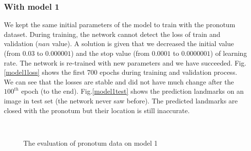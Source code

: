 \documentclass[12pt,a4paper]{article}
\begin{document}
\subsubsection{With model 1}
We kept the same initial parameters of the model to train with the pronotum dataset. During training, the network cannot detect the loss of train and validation ($nan$ value). A solution is given that we decreased the initial value (from $0.03$ to $0.000001$) and the stop value (from $0.0001$ to $0.0000001$) of learning rate. The network is re-trained with new parameters and we have succeeded. Fig.\ref{model1loss} shows the first 700 epochs during training and validation process. We can see that the losses are stable and did not have much change after the $100^{th}$ epoch (to the end). Fig.\ref{model1test} shows the prediction landmarks on an image in test set (the network never saw before). The predicted landmarks are closed with the pronotum but their location is still inaccurate.
\begin{figure}[h!]
\centering
{}~~
\caption{The evaluation of pronotum data on model 1}
\label{model1tl}
\end{figure}
\end{document}
